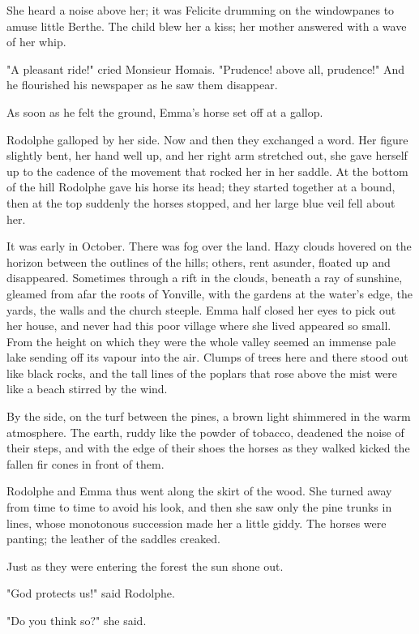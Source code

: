 \documentclass{tufte-book}
\begin{document}
She heard a noise above her; it was Felicite drumming on the windowpanes
to amuse little Berthe. The child blew her a kiss; her mother answered
with a wave of her whip.

"A pleasant ride!" cried Monsieur Homais. "Prudence! above all,
prudence!" And he flourished his newspaper as he saw them disappear.

As soon as he felt the ground, Emma's horse set off at a gallop.

Rodolphe galloped by her side. Now and then they exchanged a word. Her
figure slightly bent, her hand well up, and her right arm stretched out,
she gave herself up to the cadence of the movement that rocked her in
her saddle. At the bottom of the hill Rodolphe gave his horse its head;
they started together at a bound, then at the top suddenly the horses
stopped, and her large blue veil fell about her.

It was early in October. There was fog over the land. Hazy clouds
hovered on the horizon between the outlines of the hills; others, rent
asunder, floated up and disappeared. Sometimes through a rift in the
clouds, beneath a ray of sunshine, gleamed from afar the roots of
Yonville, with the gardens at the water's edge, the yards, the walls and
the church steeple. Emma half closed her eyes to pick out her house, and
never had this poor village where she lived appeared so small. From the
height on which they were the whole valley seemed an immense pale lake
sending off its vapour into the air. Clumps of trees here and there
stood out like black rocks, and the tall lines of the poplars that rose
above the mist were like a beach stirred by the wind.

By the side, on the turf between the pines, a brown light shimmered
in the warm atmosphere. The earth, ruddy like the powder of tobacco,
deadened the noise of their steps, and with the edge of their shoes the
horses as they walked kicked the fallen fir cones in front of them.

Rodolphe and Emma thus went along the skirt of the wood. She turned
away from time to time to avoid his look, and then she saw only the pine
trunks in lines, whose monotonous succession made her a little giddy.
The horses were panting; the leather of the saddles creaked.

Just as they were entering the forest the sun shone out.

"God protects us!" said Rodolphe.

"Do you think so?" she said.
\end{document}
